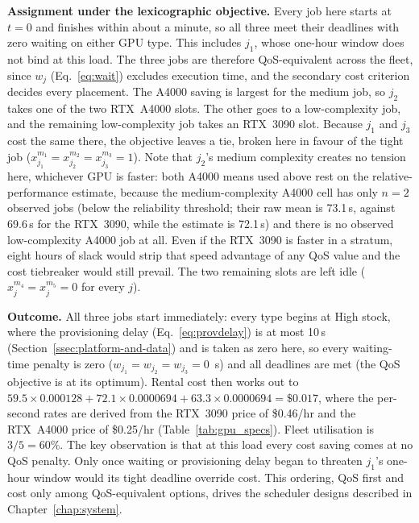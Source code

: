 \textbf{Assignment under the lexicographic objective.}
Every job here starts at $t=0$ and finishes within about a minute, so all three meet their deadlines with zero waiting on either GPU type. This includes $j_1$, whose one-hour window does not bind at this load. The three jobs are therefore QoS-equivalent across the fleet, since $w_j$ (Eq.~\ref{eq:wait}) excludes execution time, and the secondary cost criterion decides every placement. The A4000 saving is largest for the medium job, so $j_2$ takes one of the two RTX~A4000 slots. The other goes to a low-complexity job, and the remaining low-complexity job takes an RTX~3090 slot. Because $j_1$ and $j_3$ cost the same there, the objective leaves a tie, broken here in favour of the tight job ($x_{j_1}^{m_1} = x_{j_2}^{m_2} = x_{j_3}^{m_3} = 1$). Note that $j_2$'s medium complexity creates no tension here, whichever GPU is faster: both A4000 means used above rest on the relative-performance estimate, because the medium-complexity A4000 cell has only $n=2$ observed jobs (below the reliability threshold; their raw mean is 73.1\,s, against 69.6\,s for the RTX~3090, while the estimate is 72.1\,s) and there is no observed low-complexity A4000 job at all. Even if the RTX~3090 is faster in a stratum, eight hours of slack would strip that speed advantage of any QoS value and the cost tiebreaker would still prevail. The two remaining slots are left idle ($x_j^{m_4} = x_j^{m_5} = 0$ for every $j$).

\textbf{Outcome.}
All three jobs start immediately: every type begins at High stock, where the provisioning delay (Eq.~\ref{eq:provdelay}) is at most 10\,s (Section~\ref{ssec:platform-and-data}) and is taken as zero here, so every waiting-time penalty is zero ($w_{j_1} = w_{j_2} = w_{j_3} = 0$~s) and all deadlines are met (the QoS objective is at its optimum). Rental cost then works out to
$59.5 \times 0.000128 + 72.1 \times 0.0000694 + 63.3 \times 0.0000694 = \$0.017$,
where the per-second rates are derived from the RTX~3090 price of \$0.46/hr and the RTX~A4000 price of \$0.25/hr (Table~\ref{tab:gpu_specs}). Fleet utilisation is $3/5 = 60\%$. The key observation is that at this load every cost saving comes at no QoS penalty. Only once waiting or provisioning delay began to threaten $j_1$'s one-hour window would its tight deadline override cost. This ordering, QoS first and cost only among QoS-equivalent options, drives the scheduler designs described in Chapter~\ref{chap:system}.
